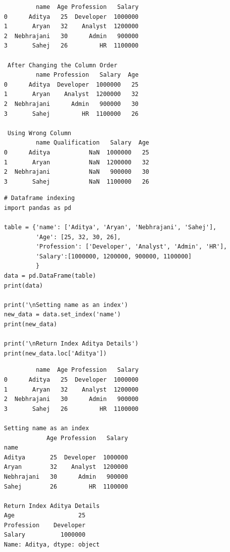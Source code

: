 \documentclass[11pt]{article}
\begin{document}
\begin{verbatim}
         name  Age Profession   Salary
0      Aditya   25  Developer  1000000
1       Aryan   32    Analyst  1200000
2  Nebhrajani   30      Admin   900000
3       Sahej   26         HR  1100000

 After Changing the Column Order
         name Profession   Salary  Age
0      Aditya  Developer  1000000   25
1       Aryan    Analyst  1200000   32
2  Nebhrajani      Admin   900000   30
3       Sahej         HR  1100000   26

 Using Wrong Column
         name Qualification   Salary  Age
0      Aditya           NaN  1000000   25
1       Aryan           NaN  1200000   32
2  Nebhrajani           NaN   900000   30
3       Sahej           NaN  1100000   26
\end{verbatim}

\begin{verbatim}
# Dataframe indexing
import pandas as pd

table = {'name': ['Aditya', 'Aryan', 'Nebhrajani', 'Sahej'],
         'Age': [25, 32, 30, 26],
         'Profession': ['Developer', 'Analyst', 'Admin', 'HR'],
         'Salary':[1000000, 1200000, 900000, 1100000]
         }
data = pd.DataFrame(table)
print(data)

print('\nSetting name as an index')
new_data = data.set_index('name')
print(new_data)

print('\nReturn Index Aditya Details')
print(new_data.loc['Aditya'])
\end{verbatim}

\begin{verbatim}
         name  Age Profession   Salary
0      Aditya   25  Developer  1000000
1       Aryan   32    Analyst  1200000
2  Nebhrajani   30      Admin   900000
3       Sahej   26         HR  1100000

Setting name as an index
            Age Profession   Salary
name
Aditya       25  Developer  1000000
Aryan        32    Analyst  1200000
Nebhrajani   30      Admin   900000
Sahej        26         HR  1100000

Return Index Aditya Details
Age                  25
Profession    Developer
Salary          1000000
Name: Aditya, dtype: object
\end{verbatim}
\end{document}
